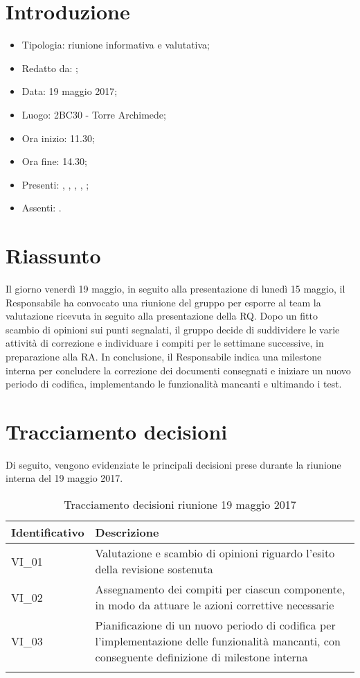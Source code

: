 \section{Introduzione}

	\begin{itemize}
		\item Tipologia: riunione informativa e valutativa;
		\item Redatto da: \AS;
		\item Data: 19 maggio 2017;
		\item Luogo: 2BC30 - Torre Archimede;
		\item Ora inizio: 11.30;
		\item Ora fine: 14.30;
		\item Presenti: \AS, \DS, \NS, \MC, \AN;	
		\item Assenti: \DAN.
	\end{itemize}

\section{Riassunto}
Il giorno venerdì 19 maggio, in seguito alla presentazione di lunedì 15 maggio, il Responsabile ha convocato una riunione del gruppo per esporre al team la valutazione ricevuta in seguito alla presentazione della RQ. 
Dopo un fitto scambio di opinioni sui punti segnalati, il gruppo decide di suddividere le varie attività di correzione e individuare i compiti per le settimane successive, in preparazione alla RA.
In conclusione, il Responsabile indica una milestone interna per concludere la correzione dei documenti consegnati e iniziare un nuovo periodo di codifica, implementando le funzionalità mancanti e ultimando i test.

\section{Tracciamento decisioni}
Di seguito, vengono evidenziate le principali decisioni prese durante la riunione interna del 19 maggio 2017.

\begin{longtable}{|>{\centering\arraybackslash}p{4cm}|>{\centering\arraybackslash}p{9cm}|}
	\hline \rowcolor{Gray}
	\textbf{Identificativo} & \textbf{Descrizione}\\
	\hline
	\endhead
			VI\_01	& Valutazione e scambio di opinioni riguardo l'esito della revisione sostenuta	\\
			\hline
			VI\_02 & Assegnamento dei compiti per ciascun componente, in modo da attuare le azioni correttive necessarie \\
			\hline
			VI\_03 & Pianificazione di un nuovo periodo di codifica per l'implementazione delle funzionalità mancanti, con conseguente definizione di milestone interna \\
			\hline
		\caption{Tracciamento decisioni riunione 19 maggio 2017}
\end{longtable}